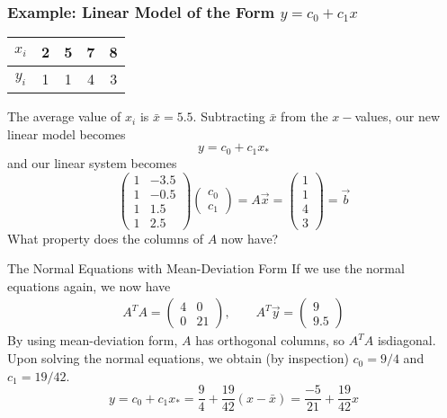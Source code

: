 \begin{frame}
\frametitle{Example: Linear Model of the Form $y = c_0 + c_1x$}

    \begin{center}
    \begin{tabular}{c|cccc} 
    $ x_i$ & 2 & 5 & 7 & 8 
    \\ \hline 
    $ y_i$ & 1 & 1 & 4 & 3 
    \end{tabular}
    \end{center}
    The average value of $x_i$ is $\bar x = 5.5$. Subtracting $\bar x$ from the $x-$values, our new linear model becomes 
    $$ y = c_0 + c_1 x_*$$
    and our linear system becomes \pause
    \begin{equation*}
    \begin{pmatrix}
    1 & -3.5 \\ 1 & -0.5 \\ 1 & 1.5 \\ 1 & 2.5
    \end{pmatrix} \begin{pmatrix}
    c _0 \\ c _1 
    \end{pmatrix} = A \vec x = \begin{pmatrix}
    1 \\ 1 \\ 4 \\ 3 
    \end{pmatrix}
    =\vec b
    \end{equation*}
    \pause 
    What property does the columns of $A$ now have?
    
\end{frame}


\begin{frame}{The Normal Equations with Mean-Deviation Form}
    If we use the normal equations again, we now have 
    \begin{align*}
    A ^{T} A = \begin{pmatrix} 4 & 0 \\ 0 & 21 \end{pmatrix} , \qquad 
    A ^{T} \vec y = \begin{pmatrix} 9 \\ 9.5 \end{pmatrix}
    \end{align*}
    \pause By using mean-deviation form, $A$ has orthogonal columns, so $A^TA$ is\pause diagonal. \pause Upon solving the normal equations, we obtain (by inspection) $c_0 = 9/4$ and $c_1 = 19/42$. 
    \begin{equation*}
        y = c _0 + c _1 x_* = \frac{9}{4} + \frac{19}{42} (x - \bar x) =  \frac{-5}{21} +  \frac{19}{42} x
    \end{equation*}
    \pause 
    
\end{frame}





